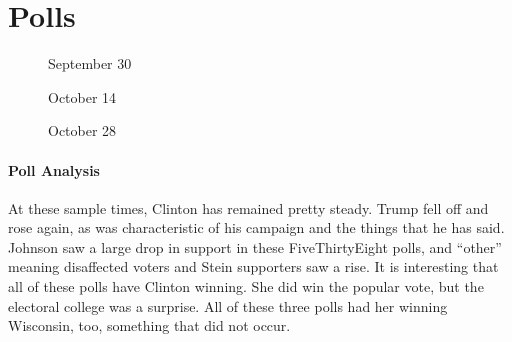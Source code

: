 \documentclass[twoside]{article}
\begin{document}
              \section{Polls}
              \begin{figure}[H]
                \centering
                \caption{September 30}
              \end{figure}
              \begin{figure}[H]
                \centering
                \caption{October 14}
              \end{figure}
              \begin{figure}[H]
                \centering
                \caption{October 28}
              \end{figure}
              \newpage
              \paragraph{Poll Analysis} At these sample times, Clinton has remained pretty steady. Trump fell off and rose again, as was characteristic of his campaign and the
              things that he has said. Johnson saw a large drop in support in these FiveThirtyEight polls, and ``other'' meaning disaffected voters and Stein supporters saw a rise.
              It is interesting that all of these polls have Clinton winning. She did win the popular vote, but the electoral college was a surprise. All of these three polls had her
              winning Wisconsin, too, something that did not occur.
              \newpage
\end{document}
